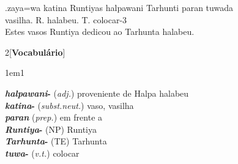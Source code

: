 \exg.zaya=wa katina Runtiyas halpawani Tarhunti paran tuwada\\
\Det{}\Acu{}\Pl{} vasilha.\Neut{}\Acu{}\Pl{} R.\Com{}\Nom{}\Sg{} halabeu.\Com{}\Dat{}\Sg{} T.\Com{}\Dat{}\Sg{} \Prep{} colocar-3\Sg\\
Estes vasos Runtiya dedicou ao Tarhunta halabeu.




\hspace{10pt}
\begin{multicols}{2}[\noindent\textbf{Vocabulário}]
	\begin{hangparas}{1em}{1}
		\raggedright%
		\textbf{\emph{halpawani}-} (\emph{adj.}) \tabto{1em} proveniente de Halpa \tabto{1em} halabeu\\
		\textbf{\emph{katina}-} (\emph{subst.neut.}) \tabto{1em} vaso, vasilha\\
		\textbf{\emph{paran}} (\emph{prep.}) \tabto{1em} em frente a\\
		\textbf{\emph{Runtiya}-} (NP) \tabto{1em} Runtiya\\
		\textbf{\emph{Tarhunta}-} (TE) \tabto{1em} Tarhunta\\
		\textbf{\emph{tuwa}-} (\emph{v.t.}) \tabto{1em} colocar\\
	\end{hangparas}
\end{multicols}
